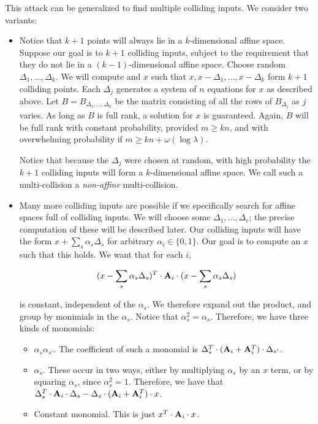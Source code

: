 This attack can be generalized to find multiple colliding inputs.  We consider two variants:
\begin{itemize}
	\item Notice that $k+1$ points will always lie in a $k$-dimensional affine space.  Suppose our goal is to $k+1$ colliding inputs, subject to the requirement that they do not lie in a $(k-1)$-dimensional affine space.  Choose random $\Delta_1,\dots,\Delta_k$.  We will compute and $x$ such that $x,x-\Delta_1,\dots,x-\Delta_k$ form $k+1$ colliding points.  Each $\Delta_j$ generates a system of $n$ equations for $x$ as described above.  Let $B=B_{\Delta_1,\dots,\Delta_k}$ be the matrix consisting of all the rows of $B_{\Delta_j}$ as $j$ varies.  As long as $B$ is full rank, a solution for $x$ is guaranteed.  Again, $B$ will be full rank with constant probability, provided $m\geq kn$, and with overwhelming probability if $m\geq kn+\omega(\log\lambda)$.
	
	Notice that because the $\Delta_j$ were chosen at random, with high probability the $k+1$ colliding inputs will form a $k$-dimensional affine space.  We call such a multi-collision a \emph{non-affine} multi-collision.  
	
	
	
	\item Many more colliding inputs are possible if we specifically search for affine spaces full of colliding inputs.  We will choose some $\Delta_1,\dots,\Delta_r$; the precise computation of these will be described later.  Our colliding inputs will have the form $x+\sum_s \alpha_s \Delta_s$ for arbitrary $\alpha_i\in\{0,1\}$.  Our goal is to compute an $x$ such that this holds.  We want that for each $i$,
	
	\[(x-\sum_s \alpha_s \Delta_s)^T\cdot{\mathbf{A}}_i\cdot(x-\sum_s \alpha_s \Delta_s)\]

	is constant, independent of the $\alpha_s$.  We therefore expand out the product, and group by monimials in the $\alpha_s$.  Notice that $\alpha_s^2=\alpha_s$.  Therefore, we have three kinds of monomials:
	
	\begin{itemize}
		\item $\alpha_s \alpha_{s'}$.  The coefficient of such a monomial is $\Delta_s^T\cdot({\mathbf{A}}_i+{\mathbf{A}}_i^T)\cdot\Delta_{s'}$.  
		\item $\alpha_s$.  These occur in two ways, either by multiplying $\alpha_s$ by an $x$ term, or by squaring $\alpha_s$, since $\alpha_s^2=1$.  Therefore, we have that $\Delta_s^T\cdot{\mathbf{A}}_i\cdot\Delta_s-\Delta_s\cdot ({\mathbf{A}}_i+{\mathbf{A}}_i^T)\cdot x$.
		\item Constant monomial.  This is just $x^T\cdot{\mathbf{A}}_i\cdot x$.
	\end{itemize}
	

\end{itemize}
